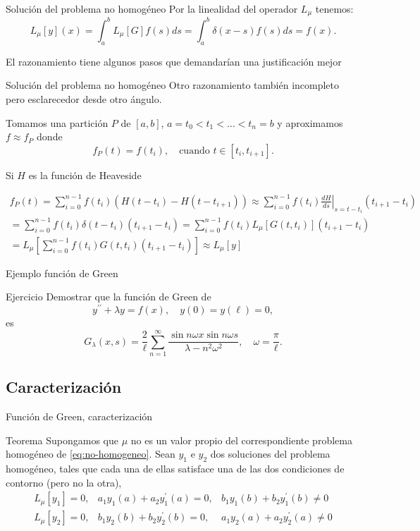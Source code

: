 \documentclass[xcolor=dvipsnames,a4paper,10pt,handout]{beamer}
\begin{document}
\begin{frame}{Solución del problema no homogéneo }
Por la linealidad del operador $L_\mu$ tenemos:
$$
L_{\mu}[y](x)=\int_a^b L_{\mu}[G]f(s) d s=\int_a^b \delta(x-s) f(s) d s=f(x) .
$$

El razonamiento tiene algunos pasos que demandarían una justificación mejor
\end{frame}


\begin{frame}{Solución del problema no homogéneo }
Otro razonamiento también incompleto pero esclarecedor desde otro ángulo.

Tomamos una partición $P$ de $[a,b]$, $a=t_0<t_1<\ldots < t_n=b$ y aproximamos $f\approx f_P$ donde  
$$f_P(t)= f(t_i),\quad \text{cuando } t\in [t_i,t_{i+1}].$$

Si $H$ es la función de Heaveside

\begin{multline*}
 f_P(t)= \sum_{i=0}^{n-1}f(t_i) (H(t-t_{i})-H(t-t_{i+1}))\approx\sum_{i=0}^{n-1}f(t_i)\left.\frac{dH}{ds}\right|_{s=t-t_i}(t_{i+1}-t_i)\\
 =\sum_{i=0}^{n-1}f(t_i)\delta(t-t_i)(t_{i+1}-t_i)=\sum_{i=0}^{n-1}f(t_i)L_{\mu}[G(t,t_i)](t_{i+1}-t_i)\\
 =L_{\mu}\left[ \sum_{i=0}^{n-1}f(t_i)G(t,t_i)(t_{i+1}-t_i)  \right]\approx L_{\mu}[y]
\end{multline*}
 


\end{frame}


\begin{frame}{Ejemplo función de Green}

\begin{block}{Ejercicio} Demostrar que la función de Green de 
 $$
y^{\prime \prime}+\lambda y=f(x), \quad y(0)=y(\ell)=0,
$$
es 
$$
G_\lambda(x, s)=\frac{2}{\ell} \sum_{n=1}^{\infty} \frac{\sin n \omega x \sin n \omega s}{\lambda-n^2 \omega^2},\quad\omega=\frac{\pi}{\ell} .
$$
\end{block}

\end{frame}

\subsection{Caracterización}
\begin{frame}{Función de Green, caracterización}

\begin{block}{Teorema} Supongamos que  $\mu$  no es un valor propio del correspondiente problema homogéneo de \eqref{eq:no-homogeneo}. Sean  $y_1$ e $y_2$ dos soluciones del problema homogéneo, tales que cada una de ellas satisface una de las dos condiciones de contorno (pero no la otra),
$$
\begin{array}{lll}
    L_\mu[ y_1]=0, & a_1 y_1(a)+a_2 y_1^{\prime}(a)=0, & b_1 y_1(b)+b_2 y_1^{\prime}(b) \neq 0 \\ 
    L_\mu[ y_2]=0, & b_1 y_2(b)+b_2 y_2^{\prime}(b)=0, & a_1 y_2(a)+a_2 y_2^{\prime}(a) \neq 0
\end{array}
$$
\end{block}
\end{frame}
\end{document}
